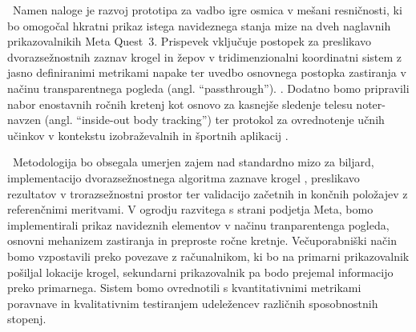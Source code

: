 \documentclass[a4paper, 12pt]{article}
\begin{document}
\ContributionsParagraph~Namen naloge je razvoj prototipa za vadbo igre osmica v mešani resničnosti, ki bo omogočal hkratni prikaz istega navideznega stanja mize na dveh naglavnih prikazovalnikih Meta Quest~3. Prispevek vključuje postopek za preslikavo  dvorazsežnostnih zaznav krogel in žepov v tridimenzionalni koordinatni sistem z jasno definiranimi metrikami napake ter uvedbo osnovnega postopka zastiranja v načinu transparentnega pogleda (angl. ``passthrough''). \cite{Macedo2023Occlusion,Krajancich2020Factored,Zhang2023AddOn,MetaDevelopers2024b}. Dodatno bomo pripravili nabor enostavnih ročnih kretenj kot osnovo za kasnejše sledenje telesu noter-navzen (angl. ``inside-out body tracking'') \cite{UploadVR2023} ter protokol za ovrednotenje učnih učinkov v kontekstu izobraževalnih in športnih aplikacij \cite{Chow2023Exergaming}.

\MethodologyParagraph~Metodologija bo obsegala umerjen zajem nad standardno mizo za biljard, implementacijo dvorazsežnostnega algoritma zaznave krogel \cite{schiøtt2025pix2pocketsshotsuggestions8ball}, preslikavo rezultatov v trorazsežnostni prostor ter validacijo začetnih in končnih položajev z referenčnimi meritvami. V ogrodju razvitega s strani podjetja Meta, bomo implementirali prikaz navideznih elementov v načinu tranparentenga pogleda, osnovni mehanizem zastiranja in preproste ročne kretnje. Večuporabniški način bomo vzpostavili preko povezave z računalnikom, ki bo na primarni prikazovalnik pošiljal lokacije krogel, sekundarni prikazovalnik pa bodo prejemal informacijo preko primarnega. Sistem bomo ovrednotili s kvantitativnimi metrikami poravnave in kvalitativnim testiranjem udeležencev različnih sposobnostnih stopenj.
{\small

}
\end{document}
